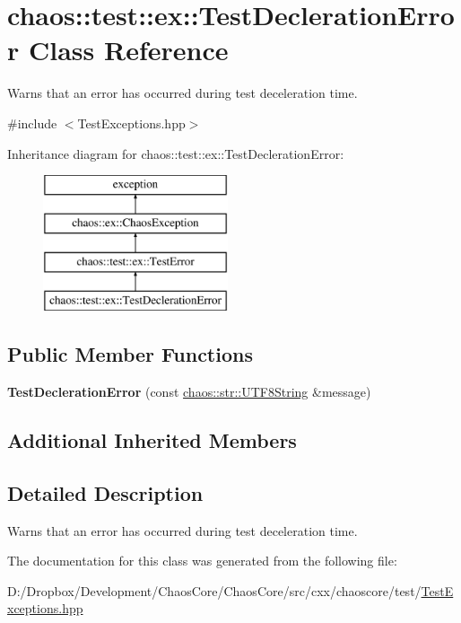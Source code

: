 \hypertarget{classchaos_1_1test_1_1ex_1_1_test_decleration_error}{}\section{chaos\+:\+:test\+:\+:ex\+:\+:Test\+Decleration\+Error Class Reference}
\label{classchaos_1_1test_1_1ex_1_1_test_decleration_error}


Warns that an error has occurred during test deceleration time.  




{\ttfamily \#include $<$Test\+Exceptions.\+hpp$>$}

Inheritance diagram for chaos\+:\+:test\+:\+:ex\+:\+:Test\+Decleration\+Error\+:\begin{figure}[H]
\begin{center}
\leavevmode
\includegraphics[height=4.000000cm]{classchaos_1_1test_1_1ex_1_1_test_decleration_error}
\end{center}
\end{figure}
\subsection*{Public Member Functions}
\begin{DoxyCompactItemize}
\item 
\hypertarget{classchaos_1_1test_1_1ex_1_1_test_decleration_error_a8259da88aff708a3058913be4ea3bf3d}{}{\bfseries Test\+Decleration\+Error} (const \hyperlink{classchaos_1_1str_1_1_u_t_f8_string}{chaos\+::str\+::\+U\+T\+F8\+String} \&message)\label{classchaos_1_1test_1_1ex_1_1_test_decleration_error_a8259da88aff708a3058913be4ea3bf3d}

\end{DoxyCompactItemize}
\subsection*{Additional Inherited Members}


\subsection{Detailed Description}
Warns that an error has occurred during test deceleration time. 

The documentation for this class was generated from the following file\+:\begin{DoxyCompactItemize}
\item 
D\+:/\+Dropbox/\+Development/\+Chaos\+Core/\+Chaos\+Core/src/cxx/chaoscore/test/\hyperlink{_test_exceptions_8hpp}{Test\+Exceptions.\+hpp}\end{DoxyCompactItemize}
